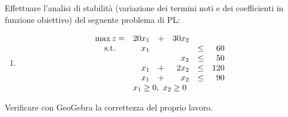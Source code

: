 \documentclass{beamer}
\begin{document}
\generatitolo

\begin{frame}{\esercizi}
Effettuare l'analisi di stabilit\`a (variazione dei termini
noti e dei coefficienti in funzione obiettivo) del seguente 
problema di PL:

\begin{enumerate}
\item
\[\begin{array}{crrrcr}
\max z=& 20 x_1 &+& 30 x_2\\
{\rm s.t.} & x_1 & &       & \leq &  60 \\
           &     & &   x_2 & \leq &  50  \\
           & x_1 &+& 2 x_2 & \leq & 120  \\
           & x_1 &+&   x_2 & \leq &  90  \\
           \multicolumn{6}{c}{x_1 \geq 0,\ x_2 \geq 0}
\end{array}%
\]%
\end{enumerate}

Verificare con GeoGebra la correttezza del proprio lavoro.
\end{frame}
\end{document}
